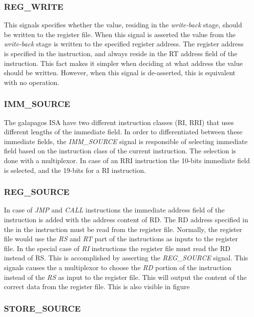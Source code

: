 \subsubsection{REG\_WRITE}
This signals specifies whether the value, residing in the \emph{write-back} stage, should be written to the register file. When this signal is asserted the value from the \emph{write-back} stage is written to the specified register address. The register address is specified in the instruction, and always reside in the RT address field of the instruction. This fact makes it simpler when deciding at what address the value should be written. However, when this signal is de-asserted, this is equivalent with no operation. 

\subsubsection{IMM\_SOURCE}
The galapagos ISA have two different instruction classes (RI, RRI) that uses different lengths of the immediate field. In order to differentiated between these immediate fields, the \emph{IMM\_SOURCE} signal is responsible of selecting immediate field based on the instruction class of the current instruction. The selection is done with a multiplexor. In case of an RRI instruction the 10-bits immediate field is selected, and the 19-bits for a RI instruction.   


\subsubsection{REG\_SOURCE}
In case of \emph{JMP} and \emph{CALL} instructions the immediate address field of the instruction is added with the address content of RD. The RD address specified in the in the instruction must be read from the register file. Normally, the register file would use the \emph{RS} and \emph{RT} part of the instructions as inputs to the register file. In the special case of \emph{RI} instructions the register file must read the RD instead of RS. This is accomplished by asserting the \emph{REG\_SOURCE} signal. This signals causes the a multiplexor to choose the \emph{RD} portion of the instruction instead of the \emph{RS} as input to the register file. This will output the content of the correct data from the register file. This is also visible in figure    


\subsubsection{STORE\_SOURCE}





